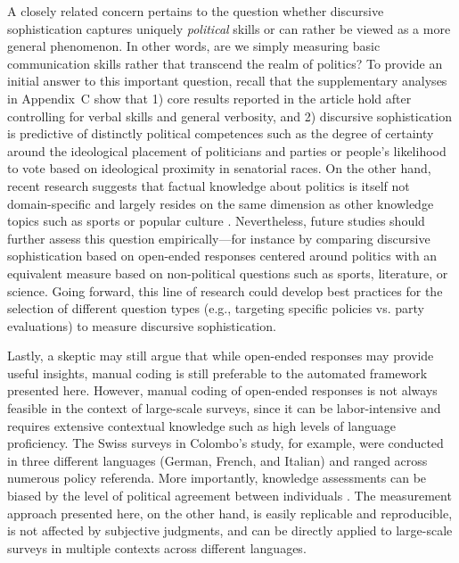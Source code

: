 A closely related concern pertains to the question whether discursive sophistication captures uniquely \textit{political} skills or can rather be viewed as a more general phenomenon. In other words, are we simply measuring basic communication skills rather that transcend the realm of politics? To provide an initial answer to this important question, recall that the supplementary analyses in Appendix~C show that 1) core results reported in the article hold after controlling for verbal skills and general verbosity, and 2) discursive sophistication is predictive of distinctly political competences such as the degree of certainty around the ideological placement of politicians and parties or people's likelihood to vote based on ideological proximity in senatorial races. On the other hand, recent research suggests that factual knowledge about politics is itself not domain-specific and largely resides on the same dimension as other knowledge topics such as sports or popular culture \citep{burnett2018political}. Nevertheless, future studies should further assess this question empirically---for instance by comparing discursive sophistication based on open-ended responses centered around politics with an equivalent measure based on non-political questions such as sports, literature, or science. Going forward, this line of research could develop best practices for the selection of different question types (e.g., targeting specific policies vs. party evaluations) to measure discursive sophistication.

Lastly, a skeptic may still argue that while open-ended responses may provide useful insights, manual coding is still preferable to the automated framework presented here. However, manual coding of open-ended responses is not always feasible in the context of large-scale surveys, since it can be labor-intensive and requires extensive contextual knowledge such as high levels of language proficiency. The Swiss surveys in Colombo's \citeyearpar{colombo2016justifications} study, for example, were conducted in three different languages (German, French, and Italian) and ranged across numerous policy referenda. More importantly, knowledge assessments can be biased by the level of political agreement between individuals \citep[e.g.,][]{ryan2011accuracy}. The measurement approach presented here, on the other hand, is easily replicable and reproducible, is not affected by subjective judgments, and can be directly applied to large-scale surveys in multiple contexts across different languages.



